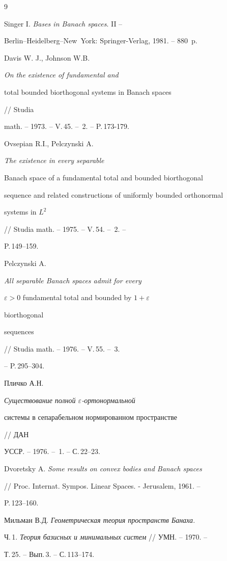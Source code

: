 \begin{thebibliography}{9} 


 




Singer I. {\em Bases in Banach spaces}. II -- 


Berlin--Heidelberg--New~York: Springer-Verlag, 1981. -- 880~p. 




Davis W. J., Johnson W.B. {\em On the existence of fundamental and 


total bounded biorthogonal systems in Banach spaces} // Studia 


math. -- 1973. -- V.\,45. -- \No\,2. -- P.\,173-179. 




Ovsepian R.I., Pelczynski A. {\em The existence in every separable 


Banach space of a fundamental total and bounded biorthogonal 


sequence and related constructions of uniformly bounded orthonormal 


systems in $L^2$} // Studia math. -- 1975. -- V.\,54. -- \No\,2. -- 


P.\,149--159. 




Pelczynski A. {\em All separable Banach spaces admit for every 


$\varepsilon>0$ fundamental total and bounded by $1+\varepsilon$ 


biorthogonal 


sequences} // Studia math. -- 1976. -- V.\,55. -- \No\,3. 


-- P.\,295--304. 




Пличко А.Н. {\em Существование полной $\varepsilon$-ортонормальной 


системы в сепарабельном нормированном пространстве} // ДАН 


УССР. -- 1976. -- \No\,1. -- С.\,22--23. 




Dvoretsky A. {\em Some results on convex bodies and Banach spaces} 


// Proc. Internat. Sympos. Linear Spaces. - Jerusalem, 1961. -- 


P.\,123--160. 




Мильман В.Д. {\em Геометрическая теория пространств Банаха}. 


Ч.\,1. {\em Теория базисных и минимальных систем} // УМН. -- 1970. -- 


Т.\,25. -- Вып.\,3. -- С.\,113--174. 


 


 


\end{thebibliography} 


 


\vskip 2cm 


 






 


\label{end} 


 


